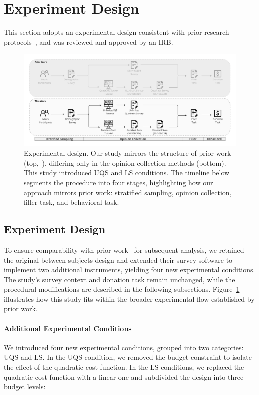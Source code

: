 \section{Experiment Design}
\label{sec:experiment}
This section adopts an experimental design consistent with prior research protocols~\cite{chengCanShowWhat2021}, and was reviewed and approved by an IRB.

\begin{figure}[t]
    \centering
    \includegraphics[width=\textwidth]{content/image/whyqs_exp_flow.pdf}
    \caption{Experimental design. Our study mirrors the structure of prior work (top,~\cite{chengCanShowWhat2021}), differing only in the opinion collection methods (bottom). This study introduced UQS and LS conditions. The timeline below segments the procedure into four stages, highlighting how our approach mirrors prior work: stratified sampling, opinion collection, filler task, and behavioral task.}
    \label{fig:experiment}
\end{figure}

\subsection{Experiment Design}
To ensure comparability with prior work~\cite{chengCanShowWhat2021} for subsequent analysis, we retained the original between-subjects design and extended their survey software to implement two additional instruments, yielding four new experimental conditions. The study's survey context and donation task remain unchanged, while the procedural modifications are described in the following subsections. Figure~\ref{fig:experiment} illustrates how this study fits within the broader experimental flow established by prior work.

\paragraph{Additional Experimental Conditions}
We introduced four new experimental conditions, grouped into two categories: UQS and LS. In the UQS condition, we removed the budget constraint to isolate the effect of the quadratic cost function. In the LS conditions, we replaced the quadratic cost function with a linear one and subdivided the design into three budget levels:


